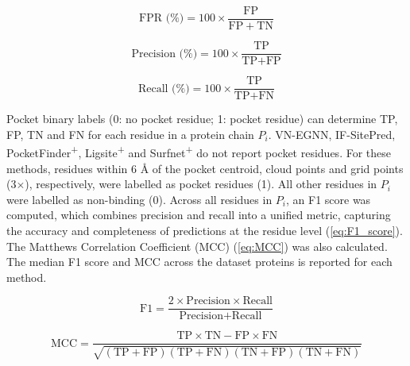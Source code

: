\vspace{-12pt} %

\begin{equation}
\text{FPR (\%)} = 100 \times \frac{\mathrm{FP}}{\mathrm{FP} + \mathrm{TN}}
\label{eq:FPR}
\end{equation}

\vspace{-12pt} %

\begin{equation}
\text{Precision (\%)} = 100 \times \frac{\text{TP}}{\text{TP} + \text{FP}}
\label{eq:precision}
\end{equation}

\vspace{-12pt} %

\begin{equation}
\text{Recall (\%)} = 100 \times \frac{\text{TP}}{\text{TP} + \text{FN}}
\label{eq:recall}
\end{equation}

\vspace{-12pt} %

Pocket binary labels (0: no pocket residue; 1: pocket residue) can determine TP, FP, TN and FN for each residue in a protein chain $P_i$. VN-EGNN, IF-SitePred, PocketFinder\textsuperscript{+}, Ligsite\textsuperscript{+} and Surfnet\textsuperscript{+} do not report pocket residues. For these methods, residues within 6 \AA{} of the pocket centroid, cloud points and grid points (3$\times$), respectively, were labelled as pocket residues (1). All other residues in $P_i$ were labelled as non-binding (0). Across all residues in $P_i$, an F1 score was computed, which combines precision and recall into a unified metric, capturing the accuracy and completeness of predictions at the residue level (\autoref{eq:F1_score}). The Matthews Correlation Coefficient (MCC) \cite{MATTHEWS_1975_MCC} (\autoref{eq:MCC}) was also calculated. The median F1 score and MCC across the dataset proteins is reported for each method.

\begin{equation}
\text{F1} = \frac{2 \times \text{Precision} \times \text{Recall}}{\text{Precision} + \text{Recall}}
\label{eq:F1_score}
\end{equation}

\begin{equation}
\text{MCC} = \frac{\text{TP} \times \text{TN} - \text{FP} \times \text{FN}}{\sqrt{(\text{TP} + \text{FP})(\text{TP} + \text{FN})(\text{TN} + \text{FP})(\text{TN} + \text{FN})}}
\label{eq:MCC}
\end{equation}

